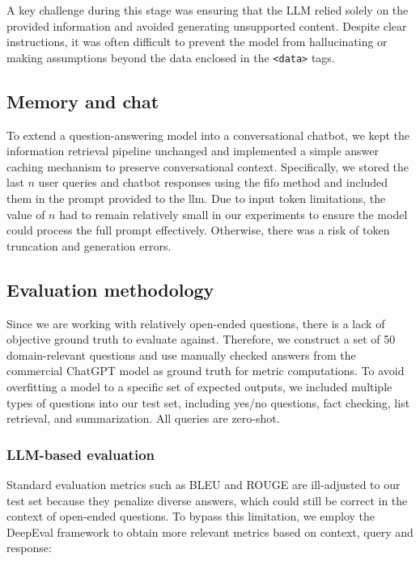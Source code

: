 \documentclass[fleqn,moreauthors,10pt]{ds_report}
\begin{document}
A key challenge during this stage was ensuring that the LLM relied solely on the provided information and avoided generating unsupported content. Despite clear instructions, it was often difficult to prevent the model from hallucinating or making assumptions beyond the data enclosed in the \verb|<data>| tags.

\subsection*{Memory and chat}

To extend a question-answering model into a conversational chatbot, we kept the information retrieval pipeline unchanged and implemented a simple answer caching mechanism to preserve conversational context. Specifically, we stored the last $n$ user queries and chatbot responses using the \ac{fifo} method and included them in the prompt provided to the \ac{llm}. Due to input token limitations, the value of $n$ had to remain relatively small in our experiments to ensure the model could process the full prompt effectively. Otherwise, there was a risk of token truncation and generation errors.

\subsection*{Evaluation methodology}

Since we are working with relatively open-ended questions, there is a lack of objective ground truth to evaluate against. Therefore, we construct a set of 50 domain-relevant questions and use manually checked answers from the commercial ChatGPT model as ground truth for metric computations. To avoid overfitting a model to a specific set of expected outputs, we included multiple types of questions into our test set, including yes/no questions, fact checking, list retrieval, and summarization. All queries are zero-shot.


\subsubsection*{LLM-based evaluation}

Standard evaluation metrics such as BLEU and ROUGE are ill-adjusted to our test set because they penalize diverse answers, which could still be correct in the context of open-ended questions. To bypass this limitation, we employ the DeepEval framework \cite{deepeval} to obtain more relevant metrics based on context, query and response:
\end{document}
